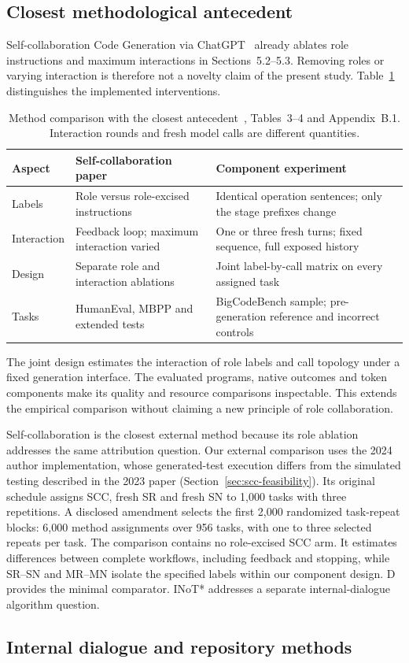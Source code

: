 \subsection{Closest methodological antecedent}
Self-collaboration Code Generation via ChatGPT~\cite{dong2023selfcollaboration} already ablates role instructions and maximum interactions in Sections~5.2--5.3. Removing roles or varying interaction is therefore not a novelty claim of the present study. Table~\ref{tab:closest-method} distinguishes the implemented interventions.

\begin{table}[htbp]\centering\small
\caption{Method comparison with the closest antecedent~\cite{dong2023selfcollaboration}, Tables~3--4 and Appendix~B.1. Interaction rounds and fresh model calls are different quantities.}\label{tab:closest-method}
\begin{tabular}{p{}p{}p{}}\toprule
Aspect & Self-collaboration paper & Component experiment\\\midrule
Labels & Role versus role-excised instructions & Identical operation sentences; only the stage prefixes change\\
Interaction & Feedback loop; maximum interaction varied & One or three fresh turns; fixed sequence, full exposed history\\
Design & Separate role and interaction ablations & Joint label-by-call matrix on every assigned task\\
Tasks & HumanEval, MBPP and extended tests & BigCodeBench sample; pre-generation reference and incorrect controls\\\bottomrule
\end{tabular}\end{table}

The joint design estimates the interaction of role labels and call topology under a fixed generation interface. The evaluated programs, native outcomes and token components make its quality and resource comparisons inspectable. This extends the empirical comparison without claiming a new principle of role collaboration.

Self-collaboration is the closest external method because its role ablation addresses the same attribution question. Our external comparison uses the 2024 author implementation, whose generated-test execution differs from the simulated testing described in the 2023 paper (Section~\ref{sec:scc-feasibility}). Its original schedule assigns SCC, fresh SR and fresh SN to 1,000 tasks with three repetitions. A disclosed amendment selects the first 2,000 randomized task-repeat blocks: 6,000 method assignments over 956 tasks, with one to three selected repeats per task. The comparison contains no role-excised SCC arm. It estimates differences between complete workflows, including feedback and stopping, while SR--SN and MR--MN isolate the specified labels within our component design. D provides the minimal comparator. INoT* addresses a separate internal-dialogue algorithm question.

\subsection{Internal dialogue and repository methods}

